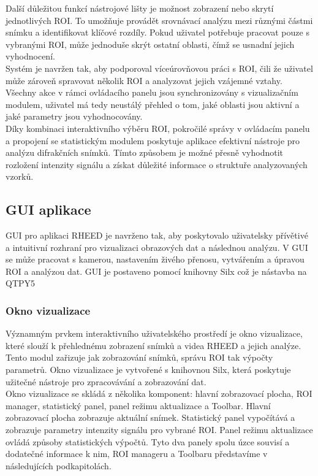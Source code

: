 \documentclass{article}
\begin{document}
Další důležitou funkcí nástrojové lišty je možnost zobrazení nebo skrytí jednotlivých ROI. To umožňuje provádět srovnávací analýzu mezi různými částmi snímku a identifikovat klíčové rozdíly. Pokud uživatel potřebuje pracovat pouze s vybranými ROI, může jednoduše skrýt ostatní oblasti, čímž se usnadní jejich vyhodnocení.\\

Systém je navržen tak, aby podporoval víceúrovňovou práci s ROI, čili že uživatel může zároveň spravovat několik ROI a analyzovat jejich vzájemné vztahy. Všechny akce v rámci ovládacího panelu jsou synchronizovány s vizualizačním modulem, uživatel má tedy neustálý přehled o tom, jaké oblasti jsou aktivní a jaké parametry jsou vyhodnocovány.\\

Díky kombinaci interaktivního výběru ROI, pokročilé správy v ovládacím panelu a propojení se statistickým modulem poskytuje aplikace efektivní nástroje pro analýzu difrakčních snímků. Tímto způsobem je možné přesně vyhodnotit rozložení intenzity signálu a získat důležité informace o struktuře analyzovaných vzorků.\\

\subsection{GUI aplikace}
GUI pro aplikaci RHEED je navrženo tak, aby poskytovalo uživatelsky přívětivé a intuitivní rozhraní pro vizualizaci obrazových dat a následnou analýzu. V GUI se může pracovat s kamerou, nastavením živého přenosu, vytvářením a úpravou ROI a analýzou dat. GUI je postaveno pomocí knihovny Silx což je nástavba na QTPY5

\subsubsection{Okno vizualizace}
Významným prvkem interaktivního uživatelského prostředí je okno vizualizace, které slouží k přehlednému zobrazení snímků a videa RHEED a jejich analýze. Tento modul zařizuje jak zobrazování snímků, správu ROI tak výpočty parametrů. Okno vizualizace je vytvořené s knihovnou Silx, která poskytuje užitečné nástroje pro zpracovávání a zobrazování dat.\\

Okno vizualizace se skládá z několika komponent: hlavní zobrazovací plocha, ROI manager, statistický panel, panel režimu aktualizace a Toolbar. Hlavní zobrazovací plocha zobrazuje aktuální snímek. Statistický panel vypočítává a zobrazuje parametry intenzity signálu pro vybrané ROI. Panel režimu aktualizace ovládá způsoby statistických výpočtů. Tyto dva panely spolu úzce souvisí a dodatečné informace k nim, ROI manageru a Toolbaru představíme v následujících podkapitolách. 
\end{document}
